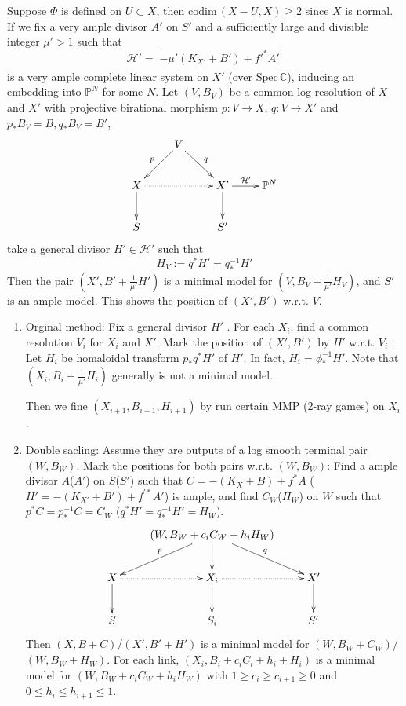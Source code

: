 \documentclass{article}
\begin{document}
Suppose $ \Phi $ is defined on $ U\subset X $, then $ \mathrm{codim}\,(X-U,X)\geqslant 2 $ since $ X $ is normal. If we fix a very ample divisor $ A'  $ on $ S' $ and a sufficiently large and divisible integer $ \mu'>1 $ such that 
$$ \mathcal{H}'=|-\mu' (K_{X'}+B') +f'^*A'| $$
is a very ample complete linear system on $ X' $ (over $ \mathrm{Spec}\,\mathbb{C} $),  inducing an embedding into $ \mathbb{P}^N $ for some $ N $.  Let $ (V,B_V) $ be a common log resolution of $ X $ and $ X' $  with projective birational morphism $ p:V\to X$,   $q:V\to X' $ and $p_*B_V=B, q_*B_V=B' $,
$$ \xymatrix{
&V\ar[ld]_p\ar[rd]^{q}&&\\
X\ar[d]\ar@{.>}[rr]&&X'\ar[d]\ar[r]^{\mathcal{H}'}&\mathbb{P}^N\\
S&&S'} $$ 
take a general divisor $ H'\in \mathcal{H}' $ such that 
$$ H_V:=q^*H'=q^{-1}_*H' $$ Then the pair $ (X',B'+\frac{1}{\mu'}H') $ is a minimal model for $ (V,B_V+\frac{1}{\mu'}H_V) $, and $ S' $ is an ample model. This shows the position of  $ (X',B') $ w.r.t. $ V $.
\begin{enumerate}
	\item Orginal method: Fix a general divisor $ H' $ . For each $ X_i $, find a common resolution $ V_i $ for $ X_i $ and $ X' $. Mark the position of $ (X',B') $ by $ H' $ w.r.t. $ V_i $ . Let $ H_i $ be homaloidal transform $ p_*q^*H' $ of $ H' $. In fact, $ H_i=\phi^{-1}_*H' $. Note that $ (X_i,B_i+\frac{1}{\mu'}H_i) $ generally is not a minimal model.
	
	Then we fine $ (X_{i+1},B_{i+1},H_{i+1}) $ by run certain MMP (2-ray games) on $ X_i $.
	\item Double sacling: Assume they are outputs of a log smooth terminal pair $ (W,B_W) $. Mark the positions for both pairs w.r.t. $ (W,B_W) $: Find a ample divisor $ A $($ A' $) on $ S $($ S' $) such that $ C=-(K_X+B)+f^*A $ ($ H'=-(K_{X'}+B')+f^{'*}A' $) is ample, and find $ C_W $($ H_W $) on $ W $ such that $ p^*C=p^{-1}_*C=C_W $ ($ q^*H'=q^{-1}_*H'=H_W $). 
	$$ \xymatrix{
		&(W,B_W+c_iC_W+h_iH_W)\ar[d]\ar[ld]_p\ar[rd]^{q}&\\
		X\ar[d]\ar@{.>}[r]&X_i\ar@{.>}[r]\ar[d]&X'\ar[d]\\
		S&S_i&S'} $$ 
	Then $ (X,B+C) $/$ (X',B'+H') $ is a minimal model for $ (W,B_W+C_W) $/$ (W,B_W+H_W) $. For each link, $ (X_i,B_i+c_iC_i+h_i+H_i) $ is a minimal model for $ (W,B_W+c_iC_W+h_iH_W) $ with $ 1\geqslant c_i\geqslant c_{i+1}\geqslant 0 $ and $ 0\leqslant h_i\leqslant h_{i+1}\leqslant 1 $. 
\end{enumerate}
\end{document}
